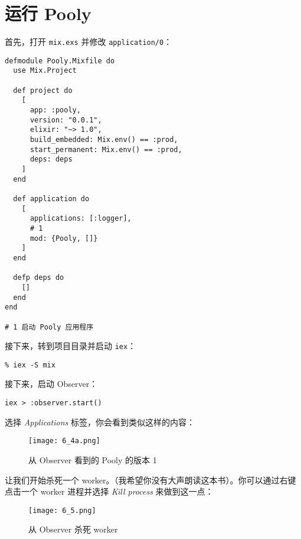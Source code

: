  \section{运行 Pooly}

首先，打开 \texttt{mix.exs} 并修改
\texttt{application/0}：

\begin{code}{}
\begin{verbatim}
defmodule Pooly.Mixfile do
  use Mix.Project

  def project do
    [
      app: :pooly,
      version: "0.0.1",
      elixir: "~> 1.0",
      build_embedded: Mix.env() == :prod,
      start_permanent: Mix.env() == :prod,
      deps: deps
    ]
  end

  def application do
    [
      applications: [:logger],
      # 1
      mod: {Pooly, []}
    ]
  end

  defp deps do
    []
  end
end

# 1 启动 Pooly 应用程序
\end{verbatim}
\end{code}


接下来，转到项目目录并启动 \texttt{iex}：

\begin{code}{}
\begin{verbatim}
% iex -S mix
\end{verbatim}
\end{code}

接下来，启动 Observer：

\begin{code}{}
\begin{verbatim}
iex > :observer.start()
\end{verbatim}
\end{code}

选择 \emph{Applications} 标签，你会看到类似这样的内容：

\begin{figure}[!ht]
    \centering
    \texttt{[image: 6\_4a.png]}
    \caption{从 Observer 看到的 Pooly 的版本 1}
    \label{fig:6_4a}
\end{figure}


让我们开始杀死一个
worker。（我希望你没有大声朗读这本书）。你可以通过右键点击一个 worker
进程并选择 \emph{Kill process} 来做到这一点：

\begin{figure}[!ht]
    \centering
    \texttt{[image: 6\_5.png]}
    \caption{从 Observer 杀死 worker}
    \label{fig:6_5}
\end{figure}

